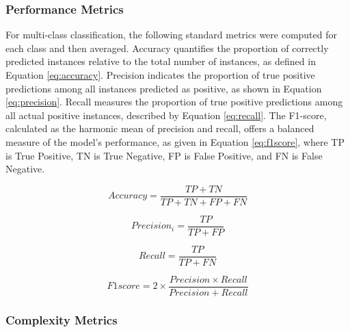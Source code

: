 \documentclass[preprint,12pt]{elsarticle}
\begin{document}
\subsubsection{Performance Metrics}

For multi-class classification, the following standard metrics were computed for each class and then averaged. Accuracy quantifies the proportion of correctly predicted instances relative to the total number of instances, as defined in Equation \eqref{eq:accuracy}. Precision indicates the proportion of true positive predictions among all instances predicted as positive, as shown in Equation \eqref{eq:precision}. Recall measures the proportion of true positive predictions among all actual positive instances, described by Equation \eqref{eq:recall}. The F1-score, calculated as the harmonic mean of precision and recall, offers a balanced measure of the model's performance, as given in Equation \eqref{eq:f1score}, where TP is True Positive, TN is True Negative, FP is False Positive, and FN is False Negative.

\begin{equation}
    Accuracy= \frac{TP+TN}{TP+TN+FP+FN}
    \label{eq:accuracy}
\end{equation}

\begin{equation}
    Precision_i=\frac{TP}{TP+FP}
    \label{eq:precision}
\end{equation}

\begin{equation}
    Recall=\frac{TP}{TP+FN}
    \label{eq:recall}
\end{equation}

\begin{equation}
    F1score=2\times\frac{Precision \times Recall}{Precision + Recall}
    \label{eq:f1score}
\end{equation}


\subsubsection{Complexity Metrics}
\end{document}
